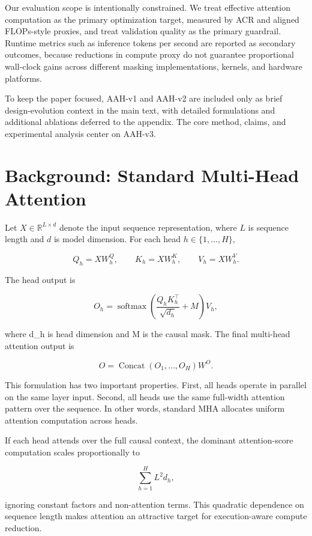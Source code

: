 \documentclass[11pt]{article}
\begin{document}
Our evaluation scope is intentionally constrained. We treat effective attention computation as the primary optimization target, measured by ACR and aligned FLOPs-style proxies, and treat validation quality as the primary guardrail. Runtime metrics such as inference tokens per second are reported as secondary outcomes, because reductions in compute proxy do not guarantee proportional wall-clock gains across different masking implementations, kernels, and hardware platforms.

To keep the paper focused, AAH-v1 and AAH-v2 are included only as brief design-evolution context in the main text, with detailed formulations and additional ablations deferred to the appendix. The core method, claims, and experimental analysis center on AAH-v3.



\section{Background: Standard Multi-Head Attention}

Let $X \in \mathbb{R}^{L \times d}$ denote the input sequence representation, where $L$ is sequence length and $d$ is model dimension. For each head $h \in \{1,\dots,H\}$,

\[
Q_h = XW_h^Q,\qquad K_h = XW_h^K,\qquad V_h = XW_h^V.
\]

The head output is

\[
O_h = \operatorname{softmax}\!\left(\frac{Q_hK_h^\top}{\sqrt{d_h}} + M\right)V_h,
\]

where d_h is head dimension and M is the causal mask. The final multi-head attention output is

\[
O = \operatorname{Concat}(O_1,\dots,O_H)W^O.
\]

This formulation has two important properties. First, all heads operate in parallel on the same layer input. Second, all heads use the same full-width attention pattern over the sequence. In other words, standard MHA allocates uniform attention computation across heads.

If each head attends over the full causal context, the dominant attention-score computation scales proportionally to

\[
\sum_{h=1}^{H} L^2 d_h,
\]

ignoring constant factors and non-attention terms. This quadratic dependence on sequence length makes attention an attractive target for execution-aware compute reduction.
\end{document}
